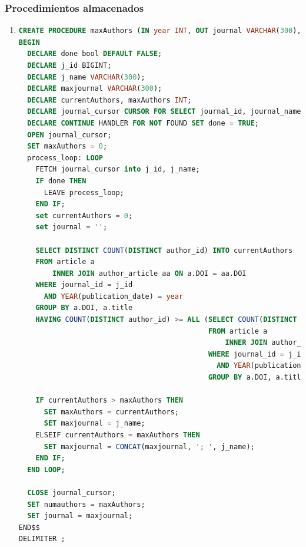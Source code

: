 \documentclass{db-practice}
\begin{document}
\subsubsection*{Procedimientos almacenados}
\begin{enumerate}
\item
\begin{lstlisting}[language=SQL]
CREATE PROCEDURE maxAuthors (IN year INT, OUT journal VARCHAR(300), OUT numauthors INT)
BEGIN
  DECLARE done bool DEFAULT FALSE;
  DECLARE j_id BIGINT;
  DECLARE j_name VARCHAR(300);
  DECLARE maxjournal VARCHAR(300);
  DECLARE currentAuthors, maxAuthors INT;
  DECLARE journal_cursor CURSOR FOR SELECT journal_id, journal_name FROM journal;
  DECLARE CONTINUE HANDLER FOR NOT FOUND SET done = TRUE; 
  OPEN journal_cursor;
  SET maxAuthors = 0;
  process_loop: LOOP
    FETCH journal_cursor into j_id, j_name;
    IF done THEN
      LEAVE process_loop;
    END IF;
    set currentAuthors = 0;
    set journal = '';
    
    SELECT DISTINCT COUNT(DISTINCT author_id) INTO currentAuthors
    FROM article a 
        INNER JOIN author_article aa ON a.DOI = aa.DOI
    WHERE journal_id = j_id 
      AND YEAR(publication_date) = year
    GROUP BY a.DOI, a.title
    HAVING COUNT(DISTINCT author_id) >= ALL (SELECT COUNT(DISTINCT author_id) 
                                             FROM article a 
                                                 INNER JOIN author_article aa ON a.DOI = aa.DOI
                                             WHERE journal_id = j_id 
                                               AND YEAR(publication_date) = year
                                             GROUP BY a.DOI, a.title);
                                             
    IF currentAuthors > maxAuthors THEN
      SET maxAuthors = currentAuthors;
      SET maxjournal = j_name;     
    ELSEIF currentAuthors = maxAuthors THEN
      SET maxjournal = CONCAT(maxjournal, '; ', j_name);     
    END IF;      
  END LOOP;
  
  CLOSE journal_cursor; 
  SET numauthors = maxAuthors;
  SET journal = maxjournal;
END$$
DELIMITER ; 
\end{lstlisting}
\end{enumerate}
\end{document}

